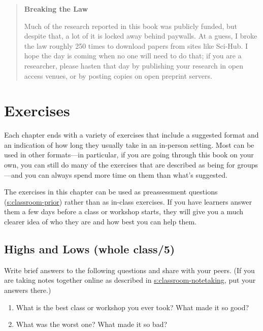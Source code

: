 \begin{quote}\setlength{\parindent}{0pt}
\textbf{Breaking the Law}

Much of the research reported in this book was publicly funded, but
despite that, a lot of it is locked away behind paywalls. At a guess,
I broke the law roughly 250 times to download papers from sites like
Sci-Hub. I hope the day is coming when no one will need to do that; if
you are a researcher, please hasten that day by publishing your
research in open access venues, or by posting copies on open preprint
servers.
\end{quote}

\section{Exercises}\label{s:intro-exercises}

Each chapter ends with a variety of exercises that include a suggested
format and an indication of how long they usually take in an in-person
setting. Most can be used in other formats---in particular, if you are
going through this book on your own, you can still do many of the
exercises that are described as being for groups---and you can always
spend more time on them than what's suggested.

The exercises in this chapter can be used as preassessment questions
(\protect\hyperlink{SECTION}{s:classroom-prior}) rather than as in-class exercises. If
you have learners answer them a few days before a class or workshop
starts, they will give you a much clearer idea of who they are and how
best you can help them.

\subsection{Highs and Lows (whole class/5)}\label{highs-and-lows-whole-class5}

Write brief answers to the following questions and share with your
peers. (If you are taking notes together online as described in
\protect\hyperlink{SECTION}{s:classroom-notetaking}, put your answers there.)

\begin{enumerate}
\item
  What is the best class or workshop you ever took? What made it so
  good?
\item
  What was the worst one? What made it so bad?
\end{enumerate}

